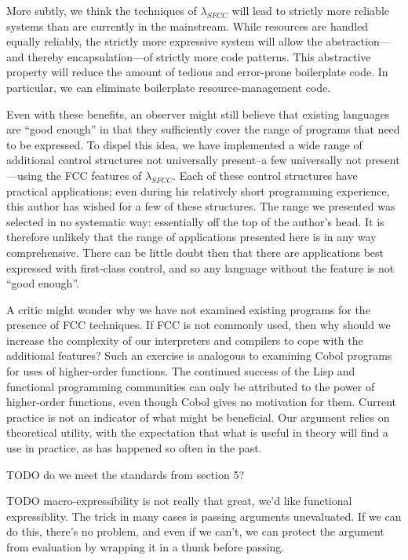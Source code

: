 \documentclass[11pt]{article}
\begin{document}
More subtly, we think the techniques of $\lambda_{SFCC}$ will lead to strictly more reliable systems than are currently in the mainstream.
While resources are handled equally reliably, the strictly more expressive system will allow the abstraction---and thereby encapsulation---of strictly more code patterns.
This abstractive property will reduce the amount of tedious and error-prone boilerplate code.
In particular, we can eliminate boilerplate resource-management code.

Even with these benefits, an observer might still believe that existing languages are ``good enough'' in that they sufficiently cover the range of programs that need to be expressed.
To dispel this idea, we have implemented a wide range of additional control structures not universally present--a few universally not present---using the FCC features of $\lambda_{SFCC}$.
Each of these control structures have practical applications; even during his relatively short programming experience, this author has wished for a few of these structures.
The range we presented was selected in no systematic way: essentially off the top of the author's head.
It is therefore unlikely that the range of applications presented here is in any way comprehensive.
There can be little doubt then that there are applications best expressed with first-class control, and so any language without the feature is not ``good enough''.

A critic might wonder why we have not examined existing programs for the presence of FCC techniques.
If FCC is not commonly used, then why should we increase the complexity of our interpreters and compilers to cope with the additional features?
Such an exercise is analogous to examining Cobol programs for uses of higher-order functions.
The continued success of the Lisp and functional programming communities can only be attributed to the power of higher-order functions, even though Cobol gives no motivation for them.
Current practice is not an indicator of what might be beneficial.
Our argument relies on theoretical utility, with the expectation that what is useful in theory will find a use in practice, as has happened so often in the past.


TODO do we meet the standards from section 5?

TODO macro-expressibility is not really that great, we'd like functional expressiblity.
The trick in many cases is passing arguments unevaluated. If we can do this, there's no problem, and even if we can't, we can protect the argument from evaluation by wrapping it in a thunk before passing.
\end{document}
